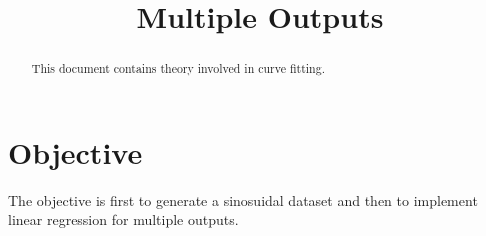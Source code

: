 \documentclass[journal,12pt,twocolumn]{IEEEtran}
\begin{document}
\makeatletter
{}
\makeatother
\let\StandardTheFigure\thefigure
\let\vec\mathbf
\renewcommand{\thefigure}{\theproblem}
\def\putbox#1#2#3{\makebox[0in][l]{\makebox[#1][l]{}\raisebox{\baselineskip}[0in][0in]{\raisebox{#2}[0in][0in]{#3}}}}
     \def\rightbox#1{\makebox[0in][r]{#1}}
     \def\centbox#1{\makebox[0in]{#1}}
     \def\topbox#1{\raisebox{-\baselineskip}[0in][0in]{#1}}
\vspace{3cm}
\title{Multiple Outputs}
\maketitle
\newpage
\bigskip
\renewcommand{\thefigure}{\theenumi}
\renewcommand{\thetable}{\theenumi}
\begin{abstract}
This document contains theory involved in curve fitting.
\end{abstract}
\section{\textbf{Objective}}
The objective is first to generate a sinosuidal dataset and then to implement linear regression for multiple outputs.
\end{document}
